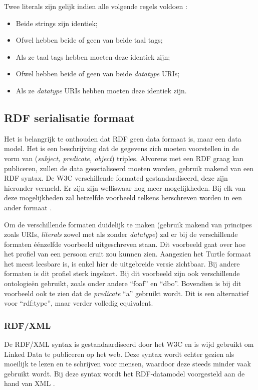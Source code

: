 Twee literals zijn gelijk indien alle volgende regels voldoen \cite{klyne2009resource}:
\begin{itemize}
    \item Beide strings zijn identiek;
    \item Ofwel hebben beide of geen van beide taal tags;
    \item Als ze taal tags hebben moeten deze identiek zijn;
    \item Ofwel hebben beide of geen van beide \textit{datatype} URIs;
    \item Als ze \textit{datatype} URIs hebben moeten deze identiek zijn.
\end{itemize}

\subsection{RDF serialisatie formaat}
\label{subsec:rdf_format}
Het is belangrijk te onthouden dat RDF geen data formaat is, maar een data model. Het is een beschrijving dat de gegevens zich moeten voorstellen in de vorm van (\textit{subject, predicate, object}) triples. Alvorens met een RDF graag kan publiceren, zullen de data geserialiseerd moeten worden, gebruik makend van een RDF syntax. De W3C verschillende formated gestandardiseerd, deze zijn hieronder vermeld. Er zijn zijn welliswaar nog meer mogelijkheden. Bij elk van deze mogelijkheden zal hetzelfde voorbeeld telkens herschreven worden in een ander formaat \cite{heath2011linked}.

Om de verschillende formaten duidelijk te maken (gebruik makend van principes zoals URIs, \textit{literals} zowel met als zonder \textit{datatype}) zal er bij de verschillende formaten éénzelfde voorbeeld uitgeschreven staan. Dit voorbeeld gaat over hoe het profiel van een persoon eruit zou kunnen zien. Aangezien het Turtle formaat het meest leesbare is, is enkel hier de uitgebreide versie zichtbaar. Bij andere formaten is dit profiel sterk ingekort. Bij dit voorbeeld zijn ook verschillende ontologieën gebruikt, zoals onder andere ``foaf'' en ``dbo''. Bovendien is bij dit voorbeeld ook te zien dat de \textit{predicate} ``a'' gebruikt wordt. Dit is een alternatief voor ``rdf:type'', maar verder volledig equivalent.

\subsubsection{RDF/XML}
De RDF/XML syntax is gestandaardiseerd door het W3C en is wijd gebruikt om Linked Data te publiceren op het web. Deze syntax wordt echter gezien als moeilijk te lezen en te schrijven voor mensen, waardoor deze steeds minder vaak gebruikt wordt. Bij deze syntax wordt het RDF-datamodel voorgesteld aan de hand van XML \cite{manola2004rdf}.

